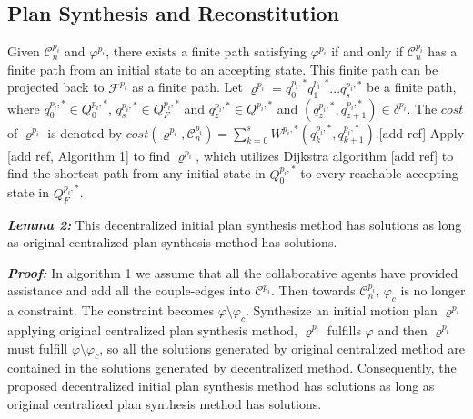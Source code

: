 \documentclass[journal]{IEEEtran}
\begin{document}
\subsection{Plan Synthesis and Reconstitution}
Given $\mathcal{C}^{p_i}_n$ and $\varphi^{p_i}$, there exists a finite path satisfying $\varphi^{p_i}$ if and only if $\mathcal{C}^{p_i}_n$ has a finite path from an initial state to an accepting state. This finite path can be projected back to $\mathcal{F}^{p_i}$ as a finite path. Let $\varrho^{p_i}=q^{p_i,\ast}_0 q^{p_i,\ast}_1 ... q^{p_i,\ast}_s$ be a finite path, where $q^{p_i,\ast}_0\in Q^{p_i,\ast}_0$, $q^{p_i,\ast}_s\in Q^{p_i,\ast}_F$ and $q^{p_i,\ast}_z\in Q^{p_i,\ast}$ and $(q^{p_i,\ast}_z,q^{p_i,\ast}_{z+1})\in \delta^{p_i}$. The $cost$ of $\varrho^{p_i}$ is denoted by $cost(\varrho^{p_i},\mathcal{C}^{p_i}_n)=\sum^{s}_{k=0}W^{p_i,\ast}(q^{p_i,\ast}_k,q^{p_i,\ast}_{k+1})$.[add ref] Apply [add ref, Algorithm 1] to find $\varrho^{p_i}$, which utilizes Dijkstra algorithm [add ref] to find the shortest path from any initial state in $Q^{p_i,\ast}_0$ to every reachable accepting state in $Q^{p_i,\ast}_F$.

\textbf{\emph{Lemma 2:}} This decentralized initial plan synthesis method has solutions as long as original centralized plan synthesis method has solutions.\par
\textbf{\emph{Proof:}} In algorithm 1 we assume that all the collaborative agents have provided assistance and add all the couple-edges into $\mathcal{C}^{p_i}$. Then towards $\mathcal{C}^{p_i}_n$, $\varphi_c$ is no longer a constraint. The constraint becomes $\varphi \setminus \varphi_c$. Synthesize an initial motion plan $\varrho^{p_i}$ applying original centralized plan synthesis method, $\varrho^{p_i}$ fulfills $\varphi$ and then $\varrho^{p_i}$ must fulfill $\varphi \setminus \varphi_c$, so all the solutions generated by original centralized method are contained in the solutions generated by decentralized method. Consequently, the proposed decentralized initial plan synthesis method has solutions as long as original centralized plan synthesis method has solutions.\par
%
\end{document}

